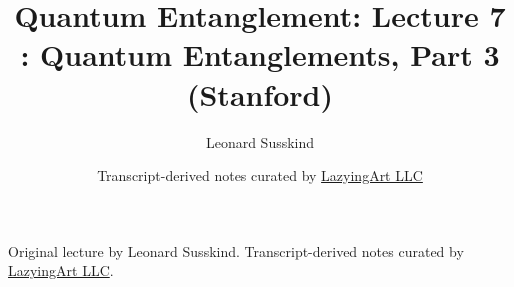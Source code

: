 \documentclass[11pt,oneside]{book}
\begin{document}
\frontmatter
\title{Quantum Entanglement: Lecture 7 : Quantum Entanglements, Part 3 (Stanford)}
\author{Leonard Susskind}
\date{Transcript-derived notes curated by \href{https://lazying.art}{LazyingArt LLC}}
\maketitle
\begin{center}
\small Original lecture by Leonard Susskind. Transcript-derived notes curated by \href{https://lazying.art}{LazyingArt LLC}.
\end{center}
\clearpage
\mainmatter

\end{document}
